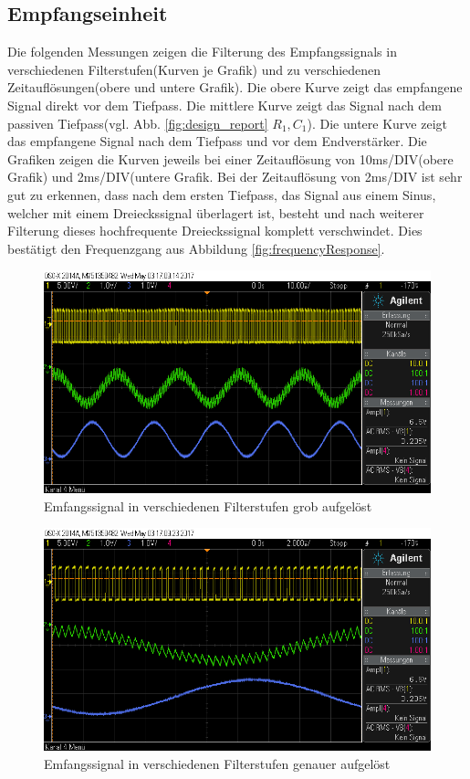 \subsection{Empfangseinheit}
Die folgenden Messungen zeigen die Filterung des Empfangssignals in verschiedenen Filterstufen(Kurven je Grafik) und zu verschiedenen Zeitauflösung\-en(obere und untere Grafik). Die obere Kurve zeigt das empfangene Signal direkt vor dem Tiefpass. Die mittlere Kurve zeigt das Signal nach dem passiven Tiefpass(vgl. Abb. \ref{fig:design_report} $R_1,C_1$). Die untere Kurve zeigt das empfangene Signal nach dem Tiefpass und vor dem Endverstärker. Die Grafiken zeigen die Kurven jeweils bei einer Zeitauflösung von 10ms/DIV(obere Grafik) und 2ms/DIV(untere Grafik. Bei der Zeitauflösung von 2ms/DIV ist sehr gut zu erkennen, dass nach dem ersten Tiefpass, das Signal aus einem Sinus, welcher mit einem Dreieckssignal überlagert ist, besteht und nach weiterer Filterung dieses hochfrequente Dreieckssignal komplett verschwindet. Dies bestätigt den Frequenzgang aus Abbildung \ref{fig:frequencyResponse}.
\begin{figure}[H]
	\centering
	\includegraphics[scale=0.45]{gfx/osziScreens/scope_10.png}
	\caption{Emfangssignal in verschiedenen Filterstufen grob aufgelöst}
\end{figure}

\begin{figure}[H]
	\centering
	\includegraphics[scale=0.45]{gfx/osziScreens/scope_11.png}
	\caption{Emfangssignal in verschiedenen Filterstufen genauer aufgelöst}
\end{figure}
